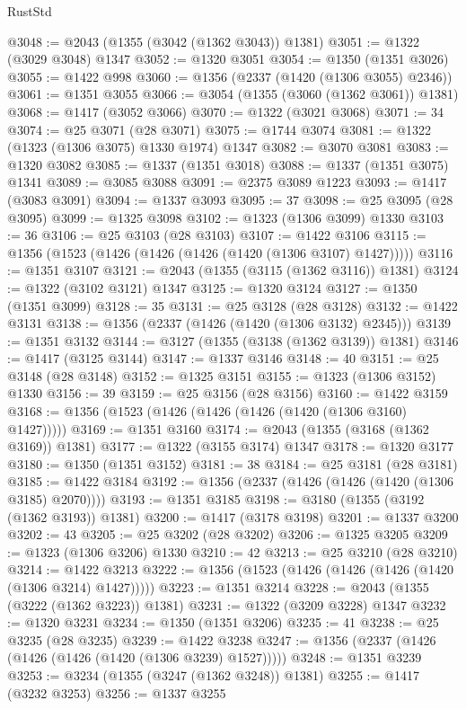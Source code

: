 \begin{lexlean}{RustStd}
\begin{coremodule}
@3048 := @2043 (@1355 (@3042 (@1362 @3043)) @1381)
@3051 := @1322 (@3029 @3048) @1347
@3052 := @1320 @3051
@3054 := @1350 (@1351 @3026)
@3055 := @1422 @998
@3060 := @1356 (@2337 (@1420 (@1306 @3055) @2346))
@3061 := @1351 @3055
@3066 := @3054 (@1355 (@3060 (@1362 @3061)) @1381)
@3068 := @1417 (@3052 @3066)
@3070 := @1322 (@3021 @3068)
@3071 := 34
@3074 := @25 @3071 (@28 @3071)
@3075 := @1744 @3074
@3081 := @1322 (@1323 (@1306 @3075) @1330 @1974) @1347
@3082 := @3070 @3081
@3083 := @1320 @3082
@3085 := @1337 (@1351 @3018)
@3088 := @1337 (@1351 @3075) @1341
@3089 := @3085 @3088
@3091 := @2375 @3089 @1223
@3093 := @1417 (@3083 @3091)
@3094 := @1337 @3093
@3095 := 37
@3098 := @25 @3095 (@28 @3095)
@3099 := @1325 @3098
@3102 := @1323 (@1306 @3099) @1330
@3103 := 36
@3106 := @25 @3103 (@28 @3103)
@3107 := @1422 @3106
@3115 := @1356 (@1523 (@1426 (@1426 (@1426 (@1420 (@1306 @3107) @1427)))))
@3116 := @1351 @3107
@3121 := @2043 (@1355 (@3115 (@1362 @3116)) @1381)
@3124 := @1322 (@3102 @3121) @1347
@3125 := @1320 @3124
@3127 := @1350 (@1351 @3099)
@3128 := 35
@3131 := @25 @3128 (@28 @3128)
@3132 := @1422 @3131
@3138 := @1356 (@2337 (@1426 (@1420 (@1306 @3132) @2345)))
@3139 := @1351 @3132
@3144 := @3127 (@1355 (@3138 (@1362 @3139)) @1381)
@3146 := @1417 (@3125 @3144)
@3147 := @1337 @3146
@3148 := 40
@3151 := @25 @3148 (@28 @3148)
@3152 := @1325 @3151
@3155 := @1323 (@1306 @3152) @1330
@3156 := 39
@3159 := @25 @3156 (@28 @3156)
@3160 := @1422 @3159
@3168 := @1356 (@1523 (@1426 (@1426 (@1426 (@1420 (@1306 @3160) @1427)))))
@3169 := @1351 @3160
@3174 := @2043 (@1355 (@3168 (@1362 @3169)) @1381)
@3177 := @1322 (@3155 @3174) @1347
@3178 := @1320 @3177
@3180 := @1350 (@1351 @3152)
@3181 := 38
@3184 := @25 @3181 (@28 @3181)
@3185 := @1422 @3184
@3192 := @1356 (@2337 (@1426 (@1426 (@1420 (@1306 @3185) @2070))))
@3193 := @1351 @3185
@3198 := @3180 (@1355 (@3192 (@1362 @3193)) @1381)
@3200 := @1417 (@3178 @3198)
@3201 := @1337 @3200
@3202 := 43
@3205 := @25 @3202 (@28 @3202)
@3206 := @1325 @3205
@3209 := @1323 (@1306 @3206) @1330
@3210 := 42
@3213 := @25 @3210 (@28 @3210)
@3214 := @1422 @3213
@3222 := @1356 (@1523 (@1426 (@1426 (@1426 (@1420 (@1306 @3214) @1427)))))
@3223 := @1351 @3214
@3228 := @2043 (@1355 (@3222 (@1362 @3223)) @1381)
@3231 := @1322 (@3209 @3228) @1347
@3232 := @1320 @3231
@3234 := @1350 (@1351 @3206)
@3235 := 41
@3238 := @25 @3235 (@28 @3235)
@3239 := @1422 @3238
@3247 := @1356 (@2337 (@1426 (@1426 (@1426 (@1420 (@1306 @3239) @1527)))))
@3248 := @1351 @3239
@3253 := @3234 (@1355 (@3247 (@1362 @3248)) @1381)
@3255 := @1417 (@3232 @3253)
@3256 := @1337 @3255

\end{coremodule}
\end{lexlean}
